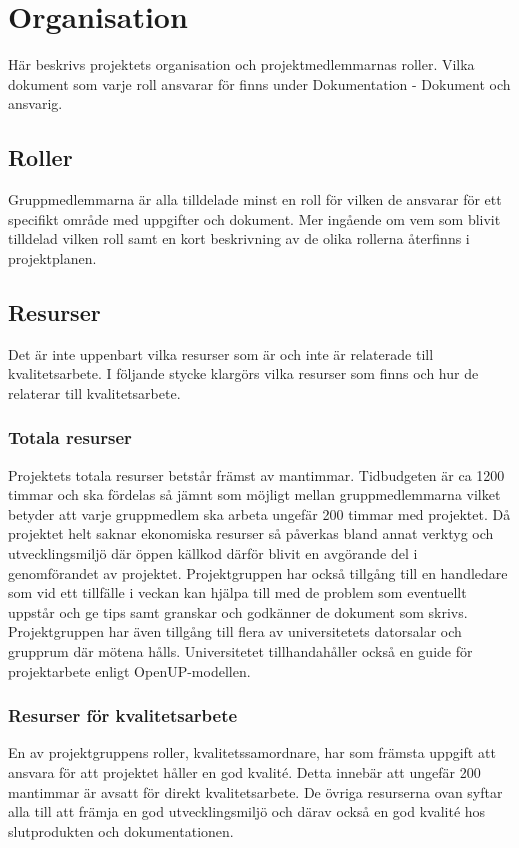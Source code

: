 \section{Organisation}
Här beskrivs projektets organisation och projektmedlemmarnas roller. Vilka dokument som varje roll ansvarar för finns under Dokumentation - Dokument och ansvarig.

\subsection{Roller}
Gruppmedlemmarna är alla tilldelade minst en roll för vilken de ansvarar för ett specifikt område med uppgifter och dokument. Mer ingående om vem som blivit tilldelad vilken roll samt en kort beskrivning av de olika rollerna återfinns i projektplanen.

\subsection{Resurser}
Det är inte uppenbart vilka resurser som är och inte är relaterade till kvalitetsarbete. I följande stycke klargörs vilka resurser som finns och hur de relaterar till kvalitetsarbete.

\subsubsection{Totala resurser}
Projektets totala resurser betstår främst av mantimmar. Tidbudgeten är ca 1200 timmar och ska fördelas så jämnt som möjligt mellan gruppmedlemmarna vilket betyder att varje gruppmedlem ska arbeta ungefär 200 timmar med projektet. Då projektet helt saknar ekonomiska resurser så påverkas bland annat verktyg och utvecklingsmiljö där öppen källkod därför blivit en avgörande del i genomförandet av projektet. Projektgruppen har också tillgång till en handledare som vid ett tillfälle i veckan kan hjälpa till med de problem som eventuellt uppstår och ge tips samt granskar och godkänner de dokument som skrivs. Projektgruppen har även tillgång till flera av universitetets datorsalar och grupprum där mötena hålls. Universitetet tillhandahåller också en guide för projektarbete enligt OpenUP-modellen.

\subsubsection{Resurser för kvalitetsarbete}
En av projektgruppens roller, kvalitetssamordnare,  har som främsta uppgift att ansvara för att projektet håller en god kvalité. Detta innebär att ungefär 200 mantimmar är avsatt för direkt kvalitetsarbete. De övriga resurserna ovan syftar alla till att främja en god utvecklingsmiljö och därav också en god kvalité hos slutprodukten och dokumentationen.

